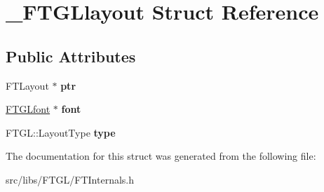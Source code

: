 \hypertarget{struct___f_t_g_llayout}{
\section{\_\-FTGLlayout Struct Reference}
\label{struct___f_t_g_llayout}
}
\subsection*{Public Attributes}
\begin{DoxyCompactItemize}
\item 
\hypertarget{struct___f_t_g_llayout_aa005e0b4dbed84077bc849aee6cc072a}{
FTLayout $\ast$ {\bfseries ptr}}
\label{struct___f_t_g_llayout_aa005e0b4dbed84077bc849aee6cc072a}

\item 
\hypertarget{struct___f_t_g_llayout_a85b58d0b7343ae0b396417b3cf74ce06}{
\hyperlink{struct___f_t_g_lfont}{FTGLfont} $\ast$ {\bfseries font}}
\label{struct___f_t_g_llayout_a85b58d0b7343ae0b396417b3cf74ce06}

\item 
\hypertarget{struct___f_t_g_llayout_ace10a672a5f6d779ede1c6dfba6096f2}{
FTGL::LayoutType {\bfseries type}}
\label{struct___f_t_g_llayout_ace10a672a5f6d779ede1c6dfba6096f2}

\end{DoxyCompactItemize}


The documentation for this struct was generated from the following file:\begin{DoxyCompactItemize}
\item 
src/libs/FTGL/FTInternals.h\end{DoxyCompactItemize}
